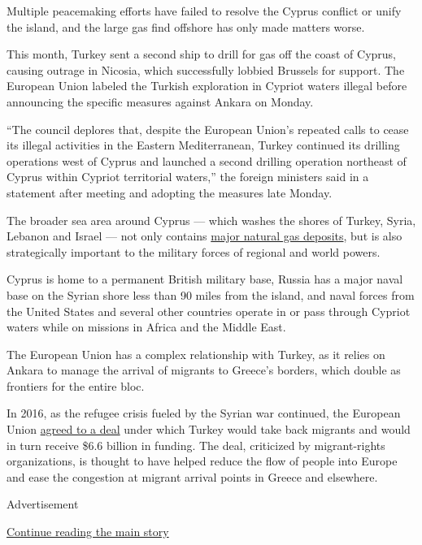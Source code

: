 Multiple peacemaking efforts have failed to resolve the Cyprus conflict
or unify the island, and the large gas find offshore has only made
matters worse.

This month, Turkey sent a second ship to drill for gas off the coast of
Cyprus, causing outrage in Nicosia, which successfully lobbied Brussels
for support. The European Union labeled the Turkish exploration in
Cypriot waters illegal before announcing the specific measures against
Ankara on Monday.

``The council deplores that, despite the European Union's repeated calls
to cease its illegal activities in the Eastern Mediterranean, Turkey
continued its drilling operations west of Cyprus and launched a second
drilling operation northeast of Cyprus within Cypriot territorial
waters,'' the foreign ministers said in a statement after meeting and
adopting the measures late Monday.

The broader sea area around Cyprus --- which washes the shores of
Turkey, Syria, Lebanon and Israel --- not only contains
\href{https://www.nytimes.com/2019/07/05/business/energy-environment/israel-natural-gas-offshore.html}{major
natural gas deposits}, but is also strategically important to the
military forces of regional and world powers.

Cyprus is home to a permanent British military base, Russia has a major
naval base on the Syrian shore less than 90 miles from the island, and
naval forces from the United States and several other countries operate
in or pass through Cypriot waters while on missions in Africa and the
Middle East.

The European Union has a complex relationship with Turkey, as it relies
on Ankara to manage the arrival of migrants to Greece's borders, which
double as frontiers for the entire bloc.

In 2016, as the refugee crisis fueled by the Syrian war continued, the
European Union
\href{https://www.nytimes.com/2016/03/19/world/europe/european-union-turkey-refugees-migrants.html}{agreed
to a deal} under which Turkey would take back migrants and would in turn
receive \$6.6 billion in funding. The deal, criticized by migrant-rights
organizations, is thought to have helped reduce the flow of people into
Europe and ease the congestion at migrant arrival points in Greece and
elsewhere.

Advertisement

\protect\hyperlink{after-bottom}{Continue reading the main story}

